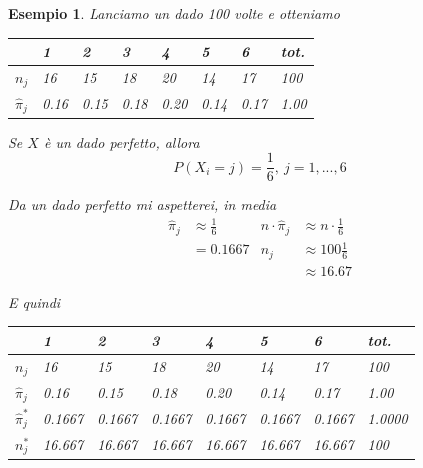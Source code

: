\documentclass[
  11pt,
]{book}
\theoremstyle{mytheoremstyle}
\theoremstyle{mydefstyle}
\newtheorem{example}{{Esempio}}[section]
\begin{document}
\begin{example}

Lanciamo un dado 100 volte e otteniamo

\begin{tabular}{llllllll}
\toprule
  & 1 & 2 & 3 & 4 & 5 & 6 & tot.\\
\midrule
$n_j$ & 16 & 15 & 18 & 20 & 14 & 17 & 100\\
$\hat\pi_j$ & 0.16 & 0.15 & 0.18 & 0.20 & 0.14 & 0.17 & 1.00\\
\bottomrule
\end{tabular}

Se \(X\) è un dado perfetto, allora
\[P(X_i=j)=\frac 1 6,~j=1,...,6\]

Da un dado perfetto mi aspetterei, in media
\[\begin{aligned}
\hat\pi_j&\approx \frac 1 6 & n\cdot\hat\pi_j &\approx n\cdot\frac 1 6\\
&= 0.1667 & n_j &\approx 100\frac 1 6\\
     &&&\approx 16.67
\end{aligned}
\]

E quindi

\begin{tabular}{llllllll}
\toprule
  & 1 & 2 & 3 & 4 & 5 & 6 & tot.\\
\midrule
$n_j$ & 16 & 15 & 18 & 20 & 14 & 17 & 100\\
$\hat\pi_j$ & 0.16 & 0.15 & 0.18 & 0.20 & 0.14 & 0.17 & 1.00\\
$\hat\pi_j^*$ & 0.1667 & 0.1667 & 0.1667 & 0.1667 & 0.1667 & 0.1667 & 1.0000\\
$n_j^*$ & 16.667 & 16.667 & 16.667 & 16.667 & 16.667 & 16.667 & 100\\
\bottomrule
\end{tabular}

\end{example}
\end{document}
